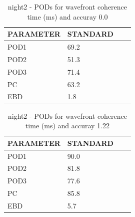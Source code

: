 \begin{table}[p!]
\begin{center}
\begin{tabular}{|l|l|l|l|}
\hline
\multicolumn{1}{|c|}{\cellcolor[HTML]{C0C0C0}\textbf{PARAMETER}} & \multicolumn{1}{c|}{\cellcolor[HTML]{C0C0C0}\textbf{STANDARD}} \\
\hline
\cellcolor[HTML]{C0C0C0}POD1  & 69.2                                \\
\cellcolor[HTML]{C0C0C0}POD2  & 51.3                                \\
\cellcolor[HTML]{C0C0C0}POD3  & 71.4                                \\
\cellcolor[HTML]{C0C0C0}PC    & 63.2                                  \\
\cellcolor[HTML]{C0C0C0}EBD   & 1.8                                 \\
\hline
\end{tabular}
\caption{night2 - PODs for wavefront coherence time (ms) and accuray 0.0}
\label{tab:podtau0.0:night2}
\end{center}
\end{table}
\begin{table}[p!]
\begin{center}
\begin{tabular}{|l|l|l|l|}
\hline
\multicolumn{1}{|c|}{\cellcolor[HTML]{C0C0C0}\textbf{PARAMETER}} & \multicolumn{1}{c|}{\cellcolor[HTML]{C0C0C0}\textbf{STANDARD}} \\
\hline
\cellcolor[HTML]{C0C0C0}POD1  & 90.0                                \\
\cellcolor[HTML]{C0C0C0}POD2  & 81.8                                \\
\cellcolor[HTML]{C0C0C0}POD3  & 77.6                                \\
\cellcolor[HTML]{C0C0C0}PC    & 85.8                                  \\
\cellcolor[HTML]{C0C0C0}EBD   & 5.7                                 \\
\hline
\end{tabular}
\caption{night2 - PODs for wavefront coherence time (ms) and accuray 1.22}
\label{tab:podtau1.22:night2}
\end{center}
\end{table}
